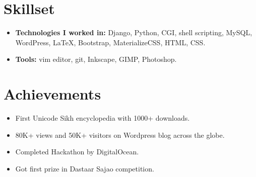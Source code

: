 \documentclass[10.1pt,a4paper,sans]{moderncv}        %
\begin{document}
\section{Skillset}

\vspace{3pt}
 
\begin{itemize}

\item \textbf{Technologies I worked in:} Django, Python, CGI, shell scripting, MySQL, WordPress, LaTeX, Bootstrap, MaterializeCSS, HTML, CSS.

\item \textbf{Tools:} vim editor, git, Inkscape, GIMP, Photoshop.
\end{itemize}

\section{Achievements}

\vspace{3pt}

\begin{itemize}

\item First Unicode Sikh encyclopedia with 1000+ downloads.
\item 80K+ views and 50K+ visitors on Wordpress blog across the globe.
\item Completed Hackathon by DigitalOcean.
\item Got first prize in Dastaar Sajao competition.

\end{itemize}

\nocite{*}



\end{document}
